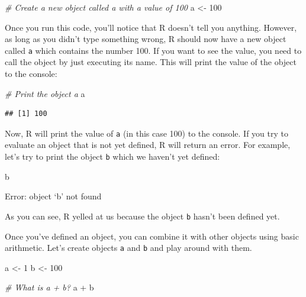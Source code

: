 \documentclass[
]{book}
\newenvironment{Shaded}{\begin{snugshade}}{\end{snugshade}}
\newcommand{\CommentTok}[1]{\textcolor[rgb]{0.56,0.35,0.01}{\textit{#1}}}
\newcommand{\DecValTok}[1]{\textcolor[rgb]{0.00,0.00,0.81}{#1}}
\newcommand{\NormalTok}[1]{#1}
\newcommand{\OtherTok}[1]{\textcolor[rgb]{0.56,0.35,0.01}{#1}}
\newcommand{\SpecialCharTok}[1]{\textcolor[rgb]{0.00,0.00,0.00}{#1}}
\begin{document}
\begin{Shaded}
\begin{Highlighting}[]
\CommentTok{\# Create a new object called a with a value of 100}
\NormalTok{a }\OtherTok{\textless{}{-}} \DecValTok{100}
\end{Highlighting}
\end{Shaded}

Once you run this code, you'll notice that R doesn't tell you anything. However, as long as you didn't type something wrong, R should now have a new object called \texttt{a} which contains the number 100. If you want to see the value, you need to call the object by just executing its name. This will print the value of the object to the console:

\begin{Shaded}
\begin{Highlighting}[]
\CommentTok{\# Print the object a}
\NormalTok{a}
\end{Highlighting}
\end{Shaded}

\begin{verbatim}
## [1] 100
\end{verbatim}

Now, R will print the value of \texttt{a} (in this case 100) to the console. If you try to evaluate an object that is not yet defined, R will return an error. For example, let's try to print the object \texttt{b} which we haven't yet defined:

\begin{Shaded}
\begin{Highlighting}[]
\NormalTok{b}
\end{Highlighting}
\end{Shaded}

Error: object `b' not found

As you can see, R yelled at us because the object \texttt{b} hasn't been defined yet.

Once you've defined an object, you can combine it with other objects using basic arithmetic. Let's create objects \texttt{a} and \texttt{b} and play around with them.

\begin{Shaded}
\begin{Highlighting}[]
\NormalTok{a }\OtherTok{\textless{}{-}} \DecValTok{1}
\NormalTok{b }\OtherTok{\textless{}{-}} \DecValTok{100}

\CommentTok{\# What is a + b?}
\NormalTok{a }\SpecialCharTok{+}\NormalTok{ b}
\end{Highlighting}
\end{Shaded}
\end{document}
